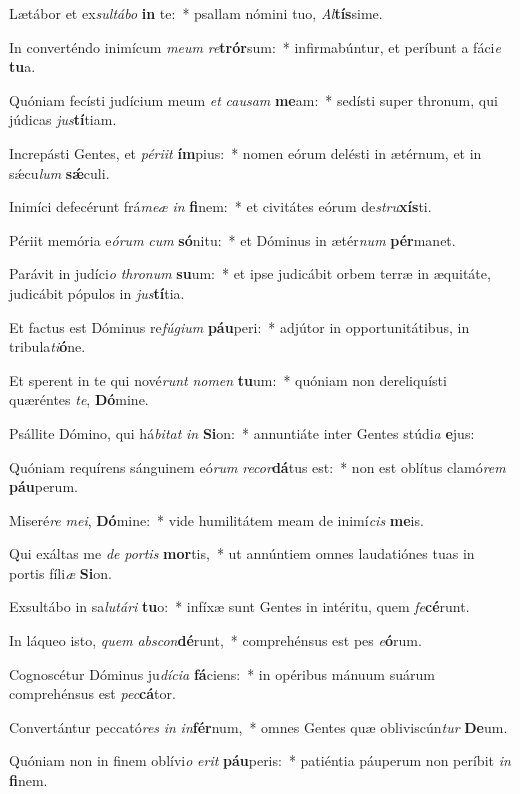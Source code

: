\item Lætábor et ex\textit{sul}\textit{tá}\textit{bo} \textbf{in} te:~* psallam nómini tuo, \textit{Al}\textbf{tís}sime.
\item In converténdo inimícum \textit{me}\textit{um} \textit{re}\textbf{trór}sum:~* infirmabúntur, et períbunt a fáci\textit{e} \textbf{tu}a.
\item Quóniam fecísti judícium meum \textit{et} \textit{cau}\textit{sam} \textbf{me}am:~* sedísti super thronum, qui júdicas \textit{jus}\textbf{tí}tiam.
\item Increpásti Gentes, et \textit{pér}\textit{i}\textit{it} \textbf{ím}pius:~* nomen eórum delésti in ætérnum, et in sǽcu\textit{lum} \textbf{sǽ}culi.
\item Inimíci defecérunt frá\textit{me}\textit{æ} \textit{in} \textbf{fi}nem:~* et civitátes eórum de\textit{stru}\textbf{xís}ti.
\item Périit memória e\textit{ó}\textit{rum} \textit{cum} \textbf{só}nitu:~* et Dóminus in ætér\textit{num} \textbf{pér}manet.
\item Parávit in judíci\textit{o} \textit{thro}\textit{num} \textbf{su}um:~* et ipse judicábit orbem terræ in æquitáte, judicábit pópulos in \textit{jus}\textbf{tí}tia.
\item Et factus est Dóminus re\textit{fú}\textit{gi}\textit{um} \textbf{páu}peri:~* adjútor in opportunitátibus, in tribula\textit{ti}\textbf{ó}ne.
\item Et sperent in te qui nové\textit{runt} \textit{no}\textit{men} \textbf{tu}um:~* quóniam non dereliquísti quæréntes \textit{te}, \textbf{Dó}mine.
\item Psállite Dómino, qui há\textit{bi}\textit{tat} \textit{in} \textbf{Si}on:~* annuntiáte inter Gentes stúdi\textit{a} \textbf{e}jus:
\item Quóniam requírens sánguinem eó\textit{rum} \textit{re}\textit{cor}\textbf{dá}tus est:~* non est oblítus clamó\textit{rem} \textbf{páu}perum.
\item Miseré\textit{re} \textit{me}\textit{i}, \textbf{Dó}mine:~* vide humilitátem meam de inimí\textit{cis} \textbf{me}is.
\item Qui exáltas me \textit{de} \textit{por}\textit{tis} \textbf{mor}tis,~* ut annúntiem omnes laudatiónes tuas in portis fíli\textit{æ} \textbf{Si}on.
\item Exsultábo in sa\textit{lu}\textit{tá}\textit{ri} \textbf{tu}o:~* infíxæ sunt Gentes in intéritu, quem \textit{fe}\textbf{cé}runt.
\item In láqueo isto, \textit{quem} \textit{abs}\textit{con}\textbf{dé}runt,~* comprehénsus est pes \textit{e}\textbf{ó}rum.
\item Cognoscétur Dóminus ju\textit{dí}\textit{ci}\textit{a} \textbf{fá}ciens:~* in opéribus mánuum suárum comprehénsus est \textit{pec}\textbf{cá}tor.
\item Convertántur peccató\textit{res} \textit{in} \textit{in}\textbf{fér}num,~* omnes Gentes quæ obliviscún\textit{tur} \textbf{De}um.
\item Quóniam non in finem oblívi\textit{o} \textit{e}\textit{rit} \textbf{páu}peris:~* patiéntia páuperum non períbit \textit{in} \textbf{fi}nem.
